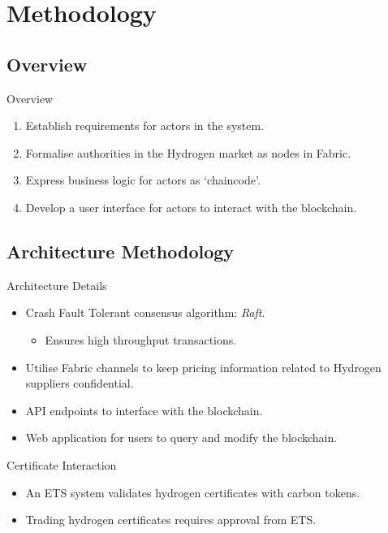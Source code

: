 \section{Methodology}
\subsection{Overview}
\begin{frame}{Overview}
    \begin{enumerate}
        \item Establish requirements for actors in the system.
        \item Formalise authorities in the Hydrogen market as nodes in Fabric.
        \item Express business logic for actors as `chaincode'.
        \item Develop a user interface for actors to interact with the
              blockchain.
    \end{enumerate}
\end{frame}
\subsection{Architecture Methodology}
\begin{frame}{Architecture Details}
    \begin{itemize}
        \item Crash Fault Tolerant consensus algorithm: \textit{Raft}.
              \begin{itemize}
                  \item Ensures high throughput transactions.
              \end{itemize}
        \item Utilise Fabric channels to keep pricing information related
              to Hydrogen suppliers confidential.
        \item API endpoints to interface with the blockchain.
        \item Web application for users to query and modify the blockchain.
    \end{itemize}
\end{frame}
\begin{frame}{Certificate Interaction}
    \begin{itemize}
        \item An ETS system validates hydrogen certificates with carbon tokens. 
        \item Trading hydrogen certificates requires approval from ETS.
    \end{itemize} 
    \begin{adjustbox}{max totalsize={1.8\textwidth}{.9\textheight},center}
        
    \end{adjustbox}
\end{frame}
